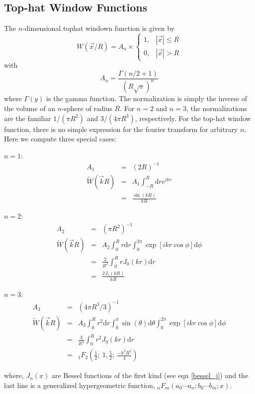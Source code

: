 \documentclass[12pt,preprint]{aastex}			%
\newcommand{\dd}{\mathrm{d}}
\begin{document}
\subsection{Top-hat Window Functions}
The $n$-dimensional tophat windown function is given by
\begin{equation}
W(\vec x/R) = A_n
\times\left\{
\begin{array}{ll}
  1, & |\vec x|\le R\\
  0, & |\vec x|>R
\end{array}
\right.
\end{equation}
with
\begin{equation}
  A_n = \frac{\Gamma(n/2+1)}{(R\sqrt\pi)^n}
\end{equation}
where $\Gamma(y)$ is the gamma function.  The normalization is simply the
inverse of the volume of an $n$-sphere of radius $R$.   
For $n=2$ and $n=3$, the normalizations are the familiar 
$1/(\pi R^2)$ and $3/(4\pi R^3)$, respectively.
For the top-hat window function, there is no
simple expression for the fourier transform for arbitrary $n$. 
Here we compute three special cases:
\begin{description}
  \item{$n=1$}:
    \begin{eqnarray}
      \label{tophat1D}
      A_1 &=& (2R)^{-1}\nonumber\\
      \widetilde W(\vec k R) &=& A_1\int_{-R}^{R}\dd r e^{ikr} \nonumber\\
      &=&\frac{\sin(kR)}{kR}
    \end{eqnarray}
  \item{$n=2$}:
    \begin{eqnarray}
      \label{tophat2D}
      A_2 &=& (\pi R^2)^{-1}\nonumber\\
      \widetilde W(\vec k R) &=& A_2\int_0^R r\dd r\int_0^{2\pi} \exp[ikr\cos\phi]\dd\phi\nonumber\\
      &=& \frac{2}{R^2}\int_0^R r J_0(kr)\dd r \nonumber\\
      &=& \frac{2J_1(kR)}{kR}
    \end{eqnarray}
  \item{$n=3$}: 
    \begin{eqnarray}
      \label{tophat3D}
      A_3 &=& (4\pi R^3/3)^{-1}\nonumber\\
      \widetilde W(\vec k R) &=& A_3\int_0^Rr^2\dd r\int_0^\pi \sin(\theta)\dd\theta\int_0^{2\pi}\exp[ikr\cos\phi]\dd\phi\nonumber\\
      &=& \frac{3}{R^3}\int_0^R r^2 J_0(kr)\dd r\nonumber\\
      &=& _1F_2(\frac{1}{2};\ 1,\frac{5}{2};\ \frac{-k^2R^2}{4})
    \end{eqnarray}
\end{description}
where, $J_n(x)$ are Bessel functions of the first kind (see eqn \ref{bessel_j})
and the last line is a generalized hypergeometric function, 
$_nF_m(a_0\cdots a_n;b_0\cdots b_m;x)$.  
\end{document}
